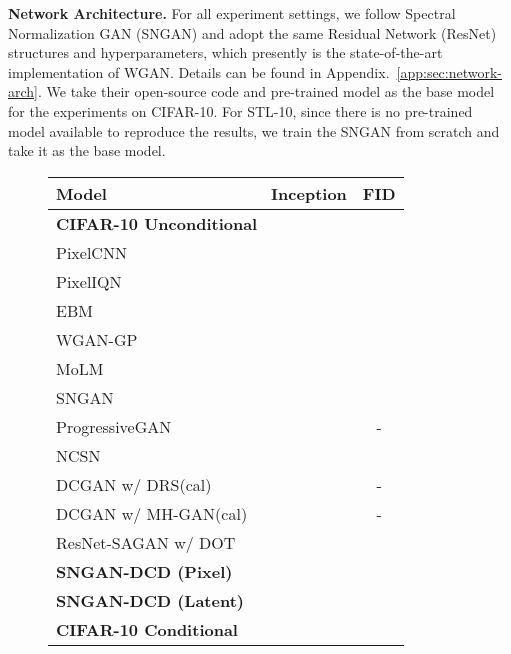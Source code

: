 \documentclass{article}
\begin{document}
\textbf{Network Architecture.}
For all experiment settings, we follow Spectral Normalization GAN (SNGAN) \cite{miyato2018spectral} and adopt the same Residual Network (ResNet) \cite{he2016deep} structures and hyperparameters, which presently is the state-of-the-art implementation of WGAN. Details can be found in Appendix.~\ref{app:sec:network-arch}. We take their open-source code and pre-trained model as the base model for the experiments on CIFAR-10. For STL-10, since there is no pre-trained model available to reproduce the results, we train the SNGAN from scratch and take it as the base model.

\begin{figure*}[t]
\begin{minipage}{0.55\textwidth}
\begin{center}
\begin{adjustbox}{max width=.9\linewidth}
\begin{tabular}{lcc}
        \toprule
        Model & Inception & FID\\
        \midrule
        \multicolumn{3}{l}{\textbf{CIFAR-10 Unconditional}} \\
        \midrule
        PixelCNN~\cite{van2016conditional} &  & \\
        PixelIQN~\cite{ostrovski2018autoregressive} &  & \\
        EBM~\cite{du2019implicit} &  &  \\
        WGAN-GP~\cite{gulrajani2017improved} &  & \\
        MoLM~\cite{ravuri2018learning} &  & \\
        SNGAN~\cite{miyato2018spectral} &  &  \\
        ProgressiveGAN~\cite{karras2017progressive} &  & - \\
        NCSN~\cite{song2019generative} & {} & \\
        \midrule
DCGAN w/ DRS(cal)~\cite{azadi2018discriminator} &  & - \\
        DCGAN w/ MH-GAN(cal)~\cite{turner2018metropolis} &  & - \\
ResNet-SAGAN w/ DOT~\cite{tanaka2019discriminator} &  & \\
        \midrule
        \textbf{SNGAN-DCD (Pixel)} & {} & \\
        \textbf{SNGAN-DCD (Latent)} & {} & \\
        \bottomrule
        \toprule
        \multicolumn{3}{l}{\textbf{CIFAR-10 Conditional}} \\
        \midrule

\end{tabular}
\end{adjustbox}
\end{center}
\end{minipage}
\end{figure*}
\end{document}
